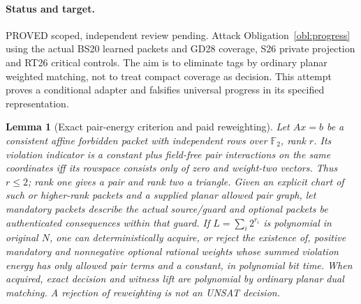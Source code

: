 \documentclass[11pt]{article}
\newtheorem{lemma}[theorem]{Lemma}
\begin{document}
\paragraph{Status and target.} PROVED scoped, independent review pending. Attack Obligation~\ref{obl:progress} using the actual BS20 learned packets and GD28 coverage, S26 private projection and RT26 critical controls. The aim is to eliminate tags by ordinary planar weighted matching, not to treat compact coverage as decision. This attempt proves a conditional adapter and falsifies universal progress in its specified representation.
\begin{lemma}[Exact pair-energy criterion and paid reweighting]\label{lem:m27-fourier}
Let $A x=b$ be a consistent affine forbidden packet with independent rows over $\mathbb F_2$, rank $r$. Its violation indicator is a constant plus field-free pair interactions on the same coordinates iff its rowspace consists only of zero and weight-two vectors. Thus $r\le2$; rank one gives a pair and rank two a triangle. Given an explicit chart of such or higher-rank packets and a supplied planar allowed pair graph, let mandatory packets describe the actual source/guard and optional packets be authenticated consequences within that guard. If $L=\sum_i2^{r_i}$ is polynomial in original $N$, one can deterministically acquire, or reject the existence of, positive mandatory and nonnegative optional rational weights whose summed violation energy has only allowed pair terms and a constant, in polynomial bit time. When acquired, exact decision and witness lift are polynomial by ordinary planar dual matching. A rejection of reweighting is not an UNSAT decision.
\end{lemma}
\end{document}

